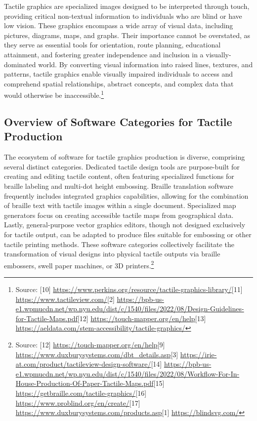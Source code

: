 Tactile graphics are specialized images designed to be interpreted through touch, providing critical non-textual information to individuals who are blind or have low vision. These graphics encompass a wide array of visual data, including pictures, diagrams, maps, and graphs. Their importance cannot be overstated, as they serve as essential tools for orientation, route planning, educational attainment, and fostering greater independence and inclusion in a visually-dominated world. By converting visual information into raised lines, textures, and patterns, tactile graphics enable visually impaired individuals to access and comprehend spatial relationships, abstract concepts, and complex data that would otherwise be inaccessible.\footnote{Source: [10] \url{https://www.perkins.org/resource/tactile-graphics-library/}[11] \url{https://www.tactileview.com/}[2] \url{https://bpb-us-e1.wpmucdn.net/wp.nyu.edu/dist/c/1540/files/2022/08/Design-Guidelines-for-Tactile-Maps.pdf}[12] \url{https://touch-mapper.org/en/help}[13] \url{https://aeldata.com/stem-accessibility/tactile-graphics/}}

\subsection{Overview of Software Categories for Tactile Production}

The ecosystem of software for tactile graphics production is diverse, comprising several distinct categories. Dedicated tactile design tools are purpose-built for creating and editing tactile content, often featuring specialized functions for braille labeling and multi-dot height embossing. Braille translation software frequently includes integrated graphics capabilities, allowing for the combination of braille text with tactile images within a single document. Specialized map generators focus on creating accessible tactile maps from geographical data. Lastly, general-purpose vector graphics editors, though not designed exclusively for tactile output, can be adapted to produce files suitable for embossing or other tactile printing methods. These software categories collectively facilitate the transformation of visual designs into physical tactile outputs via braille embossers, swell paper machines, or 3D printers.\footnote{Source: [12] \url{https://touch-mapper.org/en/help}[9] \url{https://www.duxburysystems.com/dbt_details.asp}[3] \url{https://irie-at.com/product/tactileview-design-software/}[14] \url{https://bpb-us-e1.wpmucdn.net/wp.nyu.edu/dist/c/1540/files/2022/08/Workflow-For-In-House-Production-Of-Paper-Tactile-Maps.pdf}[15] \url{https://getbraille.com/tactile-graphics/}[16] \url{https://www.problind.org/en/create/}[17] \url{https://www.duxburysystems.com/products.asp}[1] \url{https://blindsvg.com/}}

